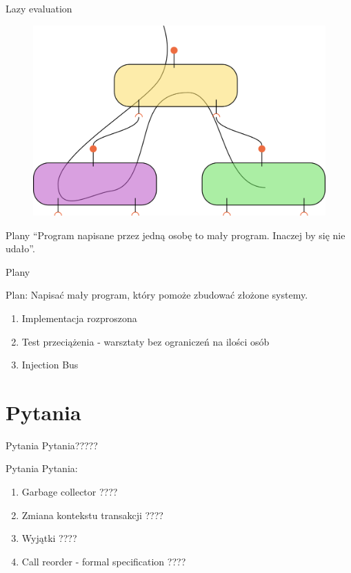 \documentclass[smaller]{beamer}
\begin{document}
\begin{frame}{Lazy evaluation}
 \begin{figure}
 \centering
 \includegraphics[width=1\textwidth]{lazyExecutionFig}
\end{figure}
\end{frame}


\begin{frame}{Plany}
``Program napisane przez jedną osobę to mały program. Inaczej by się nie udało''.
\end{frame}

\begin{frame}{Plany}

Plan: Napisać mały program, który pomoże zbudować złożone systemy.

 \begin{enumerate}
  \item<2-> Implementacja rozproszona
  \item<3-> Test przeciążenia - warsztaty bez ograniczeń na ilości osób
  \item<4-> Injection Bus
 \end{enumerate}
\end{frame}

\section{Pytania}
\begin{frame}{Pytania}
Pytania?????
\end{frame}

\begin{frame}{Pytania}
Pytania:
\begin{enumerate}
 \item<1-> Garbage collector ????
 \item<2-> Zmiana kontekstu transakcji ????
 \item<3-> Wyjątki ????
 \item<4-> Call reorder - formal specification ????
\end{enumerate}

\end{frame}
\end{document}
